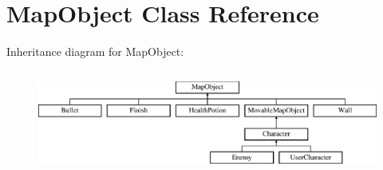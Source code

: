 \hypertarget{class_map_object}{}\section{Map\+Object Class Reference}
\label{class_map_object}
Inheritance diagram for Map\+Object\+:\begin{figure}[H]
\begin{center}
\leavevmode
\includegraphics[height=3.419847cm]{class_map_object}
\end{center}
\end{figure}
